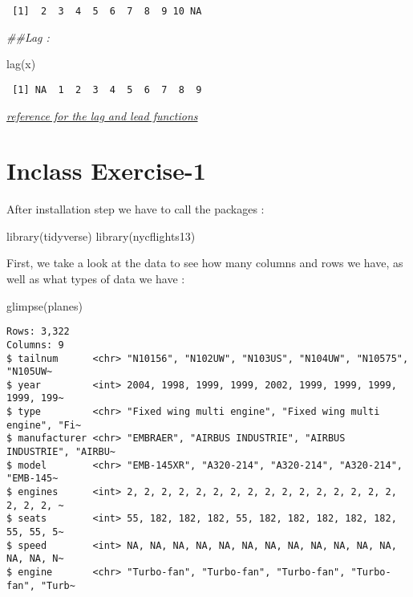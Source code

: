 \documentclass[
  letterpaper,
  DIV=11,
  numbers=noendperiod]{scrreprt}
\newenvironment{Shaded}{\begin{snugshade}}{\end{snugshade}}
\newcommand{\DocumentationTok}[1]{\textcolor[rgb]{0.37,0.37,0.37}{\textit{#1}}}
\newcommand{\FunctionTok}[1]{\textcolor[rgb]{0.28,0.35,0.67}{#1}}
\newcommand{\NormalTok}[1]{\textcolor[rgb]{0.00,0.23,0.31}{#1}}
\begin{document}
\begin{verbatim}
 [1]  2  3  4  5  6  7  8  9 10 NA
\end{verbatim}

\begin{Shaded}
\begin{Highlighting}[]
\DocumentationTok{\#\#Lag :}

\FunctionTok{lag}\NormalTok{(x)}
\end{Highlighting}
\end{Shaded}

\begin{verbatim}
 [1] NA  1  2  3  4  5  6  7  8  9
\end{verbatim}

\href{https://statisticsglobe.com/r-lead-lag-functions-dplyr-package}{\emph{reference
for the lag and lead functions}}


\hypertarget{inclass-exercise-1}{%
\chapter{Inclass Exercise-1}\label{inclass-exercise-1}}

After installation step we have to call the packages :

\begin{Shaded}
\begin{Highlighting}[]
\FunctionTok{library}\NormalTok{(tidyverse)}
\FunctionTok{library}\NormalTok{(nycflights13)}
\end{Highlighting}
\end{Shaded}

First, we take a look at the data to see how many columns and rows we
have, as well as what types of data we have :

\begin{Shaded}
\begin{Highlighting}[]
\FunctionTok{glimpse}\NormalTok{(planes)}
\end{Highlighting}
\end{Shaded}

\begin{verbatim}
Rows: 3,322
Columns: 9
$ tailnum      <chr> "N10156", "N102UW", "N103US", "N104UW", "N10575", "N105UW~
$ year         <int> 2004, 1998, 1999, 1999, 2002, 1999, 1999, 1999, 1999, 199~
$ type         <chr> "Fixed wing multi engine", "Fixed wing multi engine", "Fi~
$ manufacturer <chr> "EMBRAER", "AIRBUS INDUSTRIE", "AIRBUS INDUSTRIE", "AIRBU~
$ model        <chr> "EMB-145XR", "A320-214", "A320-214", "A320-214", "EMB-145~
$ engines      <int> 2, 2, 2, 2, 2, 2, 2, 2, 2, 2, 2, 2, 2, 2, 2, 2, 2, 2, 2, ~
$ seats        <int> 55, 182, 182, 182, 55, 182, 182, 182, 182, 182, 55, 55, 5~
$ speed        <int> NA, NA, NA, NA, NA, NA, NA, NA, NA, NA, NA, NA, NA, NA, N~
$ engine       <chr> "Turbo-fan", "Turbo-fan", "Turbo-fan", "Turbo-fan", "Turb~
\end{verbatim}
\end{document}

